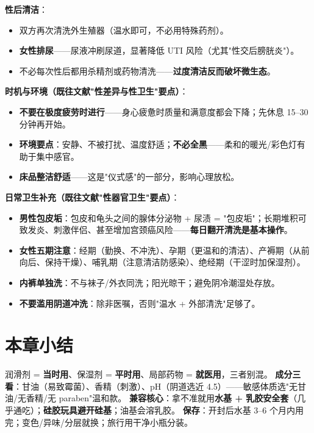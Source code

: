 \documentclass[12pt,UTF8,openany]{ctexbook}
\begin{document}
\textbf{性后清洁}：

\begin{itemize}[leftmargin=2em,itemsep=0.3em]
  \item 双方再次清洗外生殖器（温水即可，不必用特殊药剂）。
  \item \textbf{女性排尿}——尿液冲刷尿道，显著降低 UTI 风险（尤其"性交后膀胱炎"）。
  \item 不必每次性后都用杀精剂或药物清洗——\textbf{过度清洁反而破坏微生态}。
\end{itemize}

\textbf{时机与环境（既往文献"性差异与性卫生"要点）}：

\begin{itemize}[leftmargin=2em,itemsep=0.3em]
  \item \textbf{不要在极度疲劳时进行}——身心疲惫时质量和满意度都会下降；先休息 15--30 分钟再开始。
  \item \textbf{环境要点}：安静、不被打扰、温度舒适；\textbf{不必全黑}——柔和的暖光/彩色灯有助于集中感官。
  \item \textbf{床品整洁舒适}——这是"仪式感"的一部分，影响心理放松。
\end{itemize}

\textbf{日常卫生补充（既往文献"性器官卫生"要点）}：

\begin{itemize}[leftmargin=2em,itemsep=0.3em]
  \item \textbf{男性包皮垢}：包皮和龟头之间的腺体分泌物 + 尿渍 = "包皮垢"；长期堆积可致发炎、刺激伴侣、甚至增加宫颈癌风险——\textbf{每日翻开清洗是基本操作}。
  \item \textbf{女性五期注意}：经期（勤换、不冲洗）、孕期（更温和的清洁）、产褥期（从前向后、保持干燥）、哺乳期（注意清洁防感染）、绝经期（干涩时加保湿剂）。
  \item \textbf{内裤单独洗}：不与袜子/外衣同洗；阳光晾干；避免阴冷潮湿处存放。
  \item \textbf{不要滥用阴道冲洗}：除非医嘱，否则"温水 + 外部清洗"足够了。
\end{itemize}

\section{本章小结}
润滑剂 = \textbf{当时用}、保湿剂 = \textbf{平时用}、局部药物 = \textbf{就医用}，三者别混。
\textbf{成分三看}：甘油（易致霉菌）、香精（刺激）、pH（阴道选近 4.5）——敏感体质选"无甘油/无香精/无 paraben"温和款。
\textbf{兼容核心}：拿不准就用\textbf{水基 + 乳胶安全套}（几乎通吃）；\textbf{硅胶玩具避开硅基}；油基会溶乳胶。
\textbf{保存}：开封后水基 3--6 个月内用完；变色/异味/分层就换；旅行用干净小瓶分装。
\end{document}
